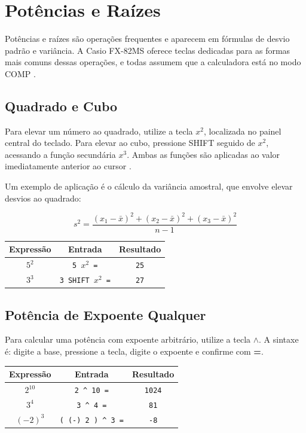 \chapter{Potências e Raízes}

Potências e raízes são operações frequentes e aparecem em fórmulas de desvio padrão e variância. A Casio FX-82MS oferece teclas dedicadas para as formas mais comuns dessas operações, e todas assumem que a calculadora está no modo COMP \cite{casio2004}.

\section{Quadrado e Cubo}

Para elevar um número ao quadrado, utilize a tecla \textbf{$x^2$}, localizada no painel central do teclado. Para elevar ao cubo, pressione SHIFT seguido de \textbf{$x^2$}, acessando a função secundária \textbf{$x^3$}. Ambas as funções são aplicadas ao valor imediatamente anterior ao cursor \cite{casio2004}.

Um exemplo de aplicação é o cálculo da variância amostral, que envolve elevar desvios ao quadrado:

\[
    s^2 = \frac{(x_1 - \bar{x})^2 + (x_2 - \bar{x})^2 + (x_3 - \bar{x})^2}{n-1}
\]

\begin{center}
\begin{tabular}{|c|c|c|}
    \hline
    \textbf{Expressão} & \textbf{Entrada} & \textbf{Resultado} \\
    \hline
    $5^2$ & \texttt{5 $x^2$ =} & \texttt{25} \\
    $3^3$ & \texttt{3 SHIFT $x^2$ =} & \texttt{27} \\
    \hline
\end{tabular}
\end{center}

\section{Potência de Expoente Qualquer}

Para calcular uma potência com expoente arbitrário, utilize a tecla \textbf{$\wedge$}. A sintaxe é: digite a base, pressione a tecla, digite o expoente e confirme com \textbf{=}.

\begin{center}
\begin{tabular}{|c|c|c|}
    \hline
    \textbf{Expressão} & \textbf{Entrada} & \textbf{Resultado} \\
    \hline
    $2^{10}$ & \texttt{2 \^{} 10 =} & \texttt{1024} \\
    $3^4$ & \texttt{3 \^{} 4 =} & \texttt{81} \\
    $(-2)^3$ & \texttt{( (-) 2 ) \^{} 3 =} & \texttt{-8} \\
    \hline
\end{tabular}
\end{center}

